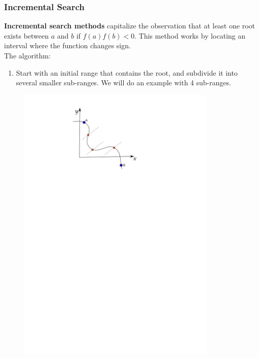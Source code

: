 \documentclass{if-beamer}
\begin{document}
\begin{frame}
\frametitle{Incremental Search}
\textbf{Incremental search methods} capitalize the observation that at least one root exists between $a$ and $b$ if $f(a)f(b)<0$. This method works by locating an interval where the function changes sign.  \\
\vspace{0.25cm}
The algorithm:
\begin{enumerate}
	\item Start with an initial range that contains the root, and subdivide it into several smaller sub-ranges. We will do an example with 4 sub-ranges.

\end{enumerate}
\begin{figure}
	\centering
	\includegraphics[width = 0.85\textwidth]{figures/incremental1}
\end{figure}
\end{frame}
\end{document}
